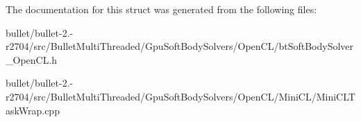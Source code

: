 The documentation for this struct was generated from the following files\+:\begin{DoxyCompactItemize}
\item 
bullet/bullet-\/2.-\/r2704/src/\+Bullet\+Multi\+Threaded/\+Gpu\+Soft\+Body\+Solvers/\+Open\+C\+L/bt\+Soft\+Body\+Solver\+\_\+\+Open\+C\+L.\+h\item 
bullet/bullet-\/2.-\/r2704/src/\+Bullet\+Multi\+Threaded/\+Gpu\+Soft\+Body\+Solvers/\+Open\+C\+L/\+Mini\+C\+L/Mini\+C\+L\+Task\+Wrap.\+cpp\end{DoxyCompactItemize}
